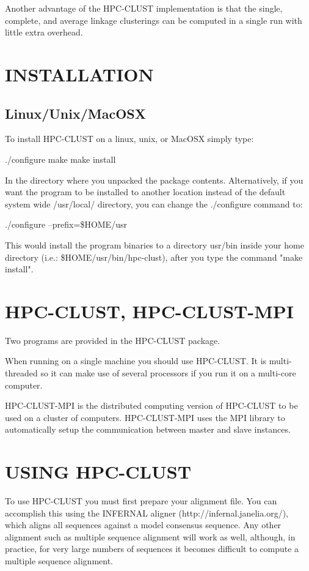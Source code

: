 \documentclass[10pt,a4paper]{article}
\begin{document}
Another advantage of the HPC-CLUST implementation is that the single, complete, and average
linkage clusterings can be computed in a single run with little extra overhead.


\section{INSTALLATION}

\subsection{Linux/Unix/MacOSX}

To install HPC-CLUST on a linux, unix, or MacOSX simply type:

./configure
make
make install

In the directory where you unpacked the package contents.
Alternatively, if you want the program to be installed to another
location instead of the default system wide /usr/local/ directory,
you can change the ./configure command to:

./configure --prefix=\$HOME/usr

This would install the program binaries to a directory usr/bin inside
your home directory (i.e.: \$HOME/usr/bin/hpc-clust), after you type
the command "make install".


\section{HPC-CLUST, HPC-CLUST-MPI}

Two programs are provided in the HPC-CLUST package.

When running on a single machine you should use HPC-CLUST. It is multi-threaded
so it can make use of several processors if you run it on a multi-core computer.

HPC-CLUST-MPI is the distributed computing version of
HPC-CLUST to be used on a cluster of computers. HPC-CLUST-MPI uses the MPI library
to automatically setup the communication between master and slave instances.


\section{USING HPC-CLUST}

To use HPC-CLUST you must first prepare your alignment file. You can accomplish this
using the INFERNAL aligner (http://infernal.janelia.org/), which aligns all sequences
against a model consensus sequence. Any other alignment such as multiple sequence
alignment will work as well, although, in practice, for very large numbers of sequences
it becomes difficult to compute a multiple sequence alignment.
\end{document}
